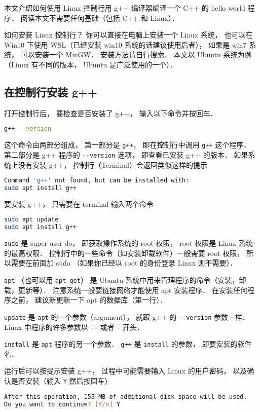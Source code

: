 
本文介绍如何使用 Linux 控制行用 g++ 编译器编译一个 C++ 的 hello world 程序． 阅读本文不需要任何基础（包括 C++ 和 Linux）．

如何安装 Linux 控制行？ 你可以直接在电脑上安装一个 Linux 系统， 也可以在 Win10 下使用 WSL（已经安装 win10 系统的话建议使用后者）， 如果是 win7 系统， 可以安装一个 MinGW． 安装方法请自行搜索． 本文以 Ubuntu 系统为例（Linux 有不同的版本， Ubuntu 是广泛使用的一个）．

\subsection{在控制行安装 g++}
打开控制行后， 要检查是否安装了 g++， 输入以下命令并按回车．
\begin{lstlisting}[language=bash]
g++ --version
\end{lstlisting}
这个命令由两部分组成， 第一部分是 \verb|g++|， 即在控制行中调用 \verb|g++| 这个程序． 第二部分是 g++ 程序的 \verb|--version| 选项， 即查看已安装 g++ 的版本． 如果系统上没有安装 g++， 控制行（Terminal）会返回类似这样的提示
\begin{lstlisting}[language=bash]
Command 'g++' not found, but can be installed with:
sudo apt install g++
\end{lstlisting}
要安装 g++， 只需要在 terminal 输入两个命令
\begin{lstlisting}[language=bash]
sudo apt update
sudo apt install g++
\end{lstlisting}
\verb|sudo| 是 super user do， 即获取操作系统的 root 权限， root 权限是 Linux 系统的最高权限． 控制行中的一些命令（如安装卸载软件）一般需要 root 权限， 所以需要在前面加 sudo （如果你已经以 root 的身份登录 Linux 则不需要）．

\verb|apt| （也可以用 \verb|apt-get|） 是 Ubuntu 系统中用来管理程序的命令（安装，卸载，更新等）． 注意系统一般要链接网络才能使用 apt 安装程序． 在安装任何程序之前， 建议新更新一下 apt 的数据库（第一行）．

\verb|update| 是 \verb|apt| 的一个参数（argument）， 就跟 g++ 的 \verb|--version| 参数一样． Linux 中程序的许多参数以 \verb|--| 或者 \verb|-| 开头．

\verb|install| 是 \verb|apt| 程序的另一个参数． \verb|g++| 是 \verb|install| 的参数， 即要安装的软件名．

运行后可以按提示安装 g++， 过程中可能需要输入 Linux 的用户密码， 以及确认是否安装（输入 \verb|Y| 然后按回车）
\begin{lstlisting}[language=bash]
After this operation, 155 MB of additional disk space will be used.
Do you want to continue? [Y/n] Y
\end{lstlisting}

